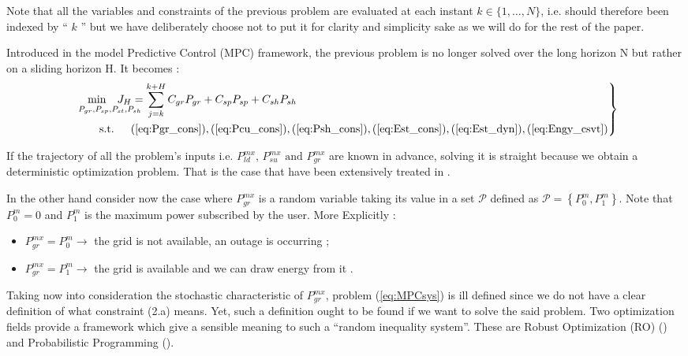 \documentclass{ifacconf}
\begin{document}
Note that all the variables and constraints of the previous problem are evaluated at each instant $k \in \{1, \ldots, N \}$, i.e. should therefore been indexed by `` $k$ '' but we have deliberately choose not to  put it for clarity and simplicity sake as we will do for the rest of the paper.

Introduced in the model Predictive Control (MPC) framework, the previous problem is no longer solved over the long horizon N but rather on a sliding horizon H. It becomes : 
\begin{equation}\label{eq:MPCsys}
\left. 
\begin{aligned}
&\underset{P_{gr},P_{sp},P_{st},P_{sh}}{\hspace{10px} \text{min} \hspace{10px}J_H =} \sum_{j=k}^{k+H} C_{gr}P_{gr} + C_{sp}P_{sp}+ C_{sh}P_{sh}\\
& \text{\hspace{20px} s.t.\hspace{15px}} (\ref{eq:Pgr_cons}),(\ref{eq:Pcu_cons}),(\ref{eq:Psh_cons}), (\ref{eq:Est_cons}), (\ref{eq:Est_dyn}),(\ref{eq:Engy_csvt})
\end{aligned}\right \}
\end{equation}

If the trajectory of all the problem's inputs i.e. $P_{ld}^{mx}$, $P_{su}^{mx}  \text{ and } P_{gr}^{mx}$ are known in advance, solving it is straight because we obtain a deterministic optimization problem. 
That is the case that have been extensively  treated in \cite{JPrPHa2019}.

In the other hand consider now the case where $P_{gr}^{mx}$ is a random variable taking its value in a set $\mathcal{P}$ defined as $ \mathcal{P} = \left \{ P_0^m , P_1^m\right \}$. Note that $P^m_0=0$ and $P_1^m$ is the maximum power subscribed by the user. More Explicitly : \begin{itemize}
\item $P_{gr}^{mx} = P_0^m \rightarrow$ the grid is not available, an outage is occurring ; 
\item $P_{gr}^{mx} = P_1^m \rightarrow$ the grid is available and we can draw energy from it . 
\end{itemize}

Taking now into consideration the stochastic characteristic of $P_{gr}^{mx}$, problem (\ref{eq:MPCsys}) is ill defined since we do not have a clear definition of what constraint (2.a) means. Yet, such a definition ought to be found if we want to solve the said problem. Two optimization fields  provide a framework which give a sensible meaning to such a ``random inequality system”. These are Robust Optimization (RO) (\cite{BenTal2009}) and Probabilistic Programming (\cite{Ankopa1995}).
\end{document}
